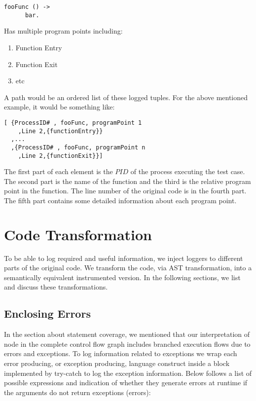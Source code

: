 \documentclass[12pt,a4paper]{report}
\begin{document}
\begin{lstlisting}
fooFunc () -> 
      bar.  
\end{lstlisting}

Has multiple program points including:

\begin{enumerate}
 \item Function Entry
 \item Function Exit
 \item etc
\end{enumerate}
 
A path would be an ordered list of these logged tuples. For the above mentioned example, it would be something like:

\begin{lstlisting}
[ {ProcessID# , fooFunc, programPoint 1
    ,Line 2,{functionEntry}}
  ,...
  ,{ProcessID# , fooFunc, programPoint n
    ,Line 2,{functionExit}}]
\end{lstlisting}

The first part of each element is the $PID$ of the process executing the test case. The second part is the name of the function and the third is the relative program point in the function. The line number of the original code is in the fourth part. The fifth part contains some detailed information about each program point.   
 
\section{Code Transformation}
To be able to log required and useful information, we inject loggers to different parts of the original code. We transform the code, via AST transformation, into a semantically equivalent instrumented version. In the following sections, we list and discuss these transformations.

\subsection{Enclosing Errors}
In the section about statement coverage, we mentioned that our interpretation of node in the complete control flow graph includes branched execution flows due to errors and exceptions. To log information related to exceptions we wrap each error producing, or exception producing, language construct inside a block implemented by try-catch to log the exception information. Below follows a list of possible expressions\cite{ErlangAbstractSyntax} and indication of whether they generate errors at runtime if the arguments do not return exceptions (errors):
\end{document}
